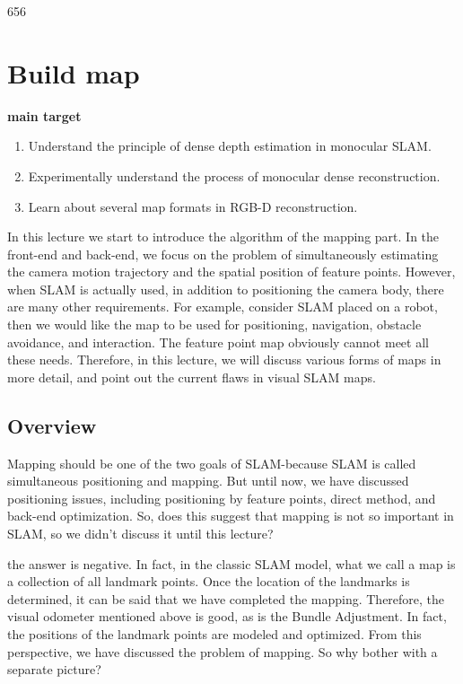 656%
\chapter{Build map}
\begin{mdframed}
\textbf{main target}
\begin{enumerate}[labelindent=0em, leftmargin=1.5em]
\item Understand the principle of dense depth estimation in monocular SLAM.
\item Experimentally understand the process of monocular dense reconstruction.
\item Learn about several map formats in RGB-D reconstruction.
\end{enumerate}
\end{mdframed}

In this lecture we start to introduce the algorithm of the mapping part. In the front-end and back-end, we focus on the problem of simultaneously estimating the camera motion trajectory and the spatial position of feature points. However, when SLAM is actually used, in addition to positioning the camera body, there are many other requirements. For example, consider SLAM placed on a robot, then we would like the map to be used for positioning, navigation, obstacle avoidance, and interaction. The feature point map obviously cannot meet all these needs. Therefore, in this lecture, we will discuss various forms of maps in more detail, and point out the current flaws in visual SLAM maps.

\newpage
\section{Overview}
Mapping should be one of the two goals of SLAM-because SLAM is called simultaneous positioning and mapping. But until now, we have discussed positioning issues, including positioning by feature points, direct method, and back-end optimization. So, does this suggest that mapping is not so important in SLAM, so we didn't discuss it until this lecture?

the answer is negative. In fact, in the classic SLAM model, what we call a map is a collection of all landmark points. Once the location of the landmarks is determined, it can be said that we have completed the mapping. Therefore, the visual odometer mentioned above is good, as is the Bundle Adjustment. In fact, the positions of the landmark points are modeled and optimized. From this perspective, we have discussed the problem of mapping. So why bother with a separate picture?

